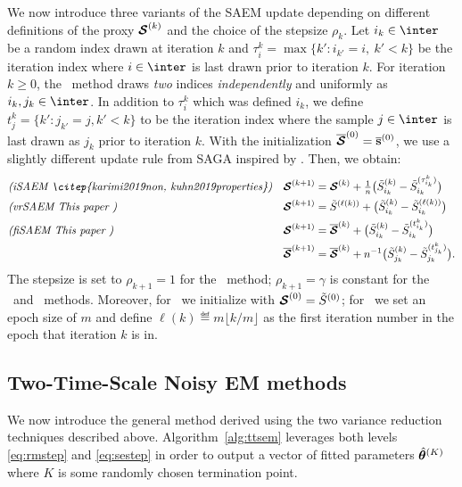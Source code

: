 \documentclass[11pt]{article}
\theoremstyle{t}
\begin{document}
We now introduce three variants of the SAEM update depending on different definitions of the proxy $\StocEstep^{(k)}$ and the choice of the stepsize $\rho_k$.
Let $i_k \in \inter$ be a random index drawn at iteration $k$ and $\tau_i^k = \max \{ k' : i_{k'} = i,~k' < k \}$ be the iteration index where $i \in \inter$ is last drawn prior to iteration $k$.
For iteration $k \geq 0$, the \FISAEM\ method draws \emph{two} indices \emph{independently} and uniformly as $i_k, j_k \in \inter$. In addition to $\tau_i^k$ which was defined \wrt $i_k$, we define $t_j^k = \{ k' : j_{k'} = j , k' < k \}$ to be the iteration index where the sample $j \in \inter$ is last drawn as $j_k$ prior to iteration $k$. With the initialization $\overline{\StocEstep}^{(0)} = \overline{\bss}^{(0)}$, we use a slightly different update rule from SAGA inspired by \citep{reddi2016fast}. Then, we obtain:
\begin{align}
&\emph{(\ISAEM\ \citep{karimi2019non, kuhn2019properties})} & \StocEstep^{(k+1)} &= \StocEstep^{(k)} + {\textstyle \frac{1}{n}}\big( \tilde{S}_{i_k}^{(k)}  - \tilde{S}_{i_k}^{(\tau_{i_k}^k)} \big) \label{eq:isaem} \\
&\emph{(\SAEMVR\ This paper )} &\StocEstep^{(k+1)} &= \tilde{S}^{(\ell(k))} +  \big( \tilde{S}_{i_k}^{(k)}  -\tilde{S}_{i_k}^{(\ell(k))}   \big) \label{eq:vrsaem}\\
&\emph{(\FISAEM\ This paper )} &\StocEstep^{(k+1)} &= \overline{\StocEstep}^{(k)} + \big( \tilde{S}_{i_k}^{(k)}  - \tilde{S}_{i_k}^{(t_{i_k}^k)} \big) \label{eq:fisaem}\\
&    &\overline{\StocEstep}^{(k+1)} &= \overline{\StocEstep}^{(k)} + n^{-1} \big( \tilde{S}_{j_k}^{(k)}  - \tilde{S}_{j_k}^{(t_{j_k}^k)} \big).
\end{align}
The stepsize is set to $\rho_{k+1} = 1$ for the \ISAEM\ method; $\rho_{k+1} = \gamma$ is  constant for the \SAEMVR\ and \FISAEM\ methods.
Moreover, for \ISAEM\ we initialize with $\StocEstep^{(0)} = \tilde{S}^{(0)}$; for \SAEMVR\, we set an epoch size of $m$ and define $\ell(k) \eqdef m \lfloor k/m \rfloor$ as the first iteration number in the epoch that iteration $k$ is in. \vspace{-.2cm}


\subsection{Two-Time-Scale Noisy EM methods}
We now introduce the general method derived using the two variance reduction techniques described above.
Algorithm~\ref{alg:ttsem} leverages both levels \eqref{eq:rmstep} and \eqref{eq:sestep} in order to output a vector of fitted parameters $\hat{\param}^{(K)}$ where $K$ is some randomly chosen termination point.
\end{document}
